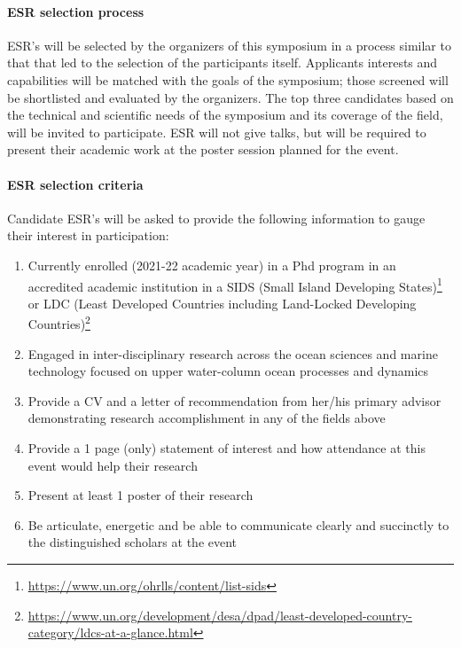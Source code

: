 \paragraph{ESR selection process} ESR's will be selected by the
organizers of this symposium in a process similar to that that led to
the selection of the participants itself. Applicants interests and
capabilities will be matched with the goals of the symposium; those
screened will be shortlisted and evaluated by the organizers. The top
three candidates based on the technical and scientific needs of the
symposium and its coverage of the field, will be invited to
participate. ESR will not give talks, but will be required to present
their academic work at the poster session planned for the event.

\paragraph{ESR selection criteria} Candidate ESR's will be asked to
provide the following information to gauge their interest in participation:

\begin{enumerate}[noitemsep,topsep=0pt,parsep=0pt,partopsep=0pt]

\item Currently enrolled (2021-22 academic year) in a Phd program in
  an accredited academic institution in a SIDS (Small Island
  Developing States)\footnote{\url{https://www.un.org/ohrlls/content/list-sids}} or LDC (Least Developed Countries including Land-Locked
   Developing Countries)\footnote{\url{https://www.un.org/development/desa/dpad/least-developed-country-category/ldcs-at-a-glance.html}}
\item Engaged in inter-disciplinary research across the ocean sciences
  and marine technology focused on upper water-column ocean processes
  and dynamics 
\item Provide a CV and a letter of recommendation from her/his primary
  advisor demonstrating research accomplishment in any of the fields
  above 
\item Provide a 1 page (only) statement of interest and how attendance
  at this event would help their research  
\item Present at least 1 poster of their research
\item Be articulate, energetic and be able to communicate clearly and
  succinctly to the distinguished scholars at the event 
\end{enumerate}  

